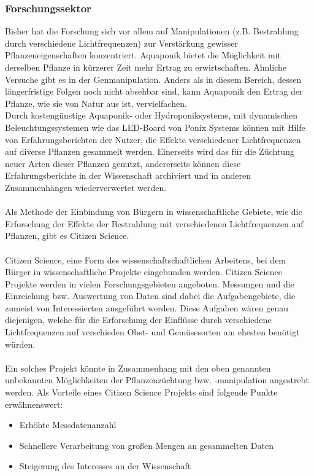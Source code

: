 \subsubsection{Forschungssektor}
Bisher hat die Forschung sich vor allem auf Manipulationen (z.B. Bestrahlung durch verschiedene Lichtfrequenzen) zur Verstärkung gewisser Pflanzeneigenschaften konzentriert. Aquaponik bietet die Möglichkeit mit derselben Pflanze in kürzerer Zeit mehr Ertrag zu erwirtschaften. Ähnliche Versuche gibt es in der Genmanipulation. Anders als in diesem Bereich, dessen längerfristige Folgen noch nicht absehbar sind, kann Aquaponik den Ertrag der Pflanze, wie sie von Natur aus ist, vervielfachen.\\
Durch kostengünstige Aquaponik- oder Hydroponiksysteme, mit dynamischen Beleuchtungssystemen wie das LED-Board von Ponix Systems können mit Hilfe von Erfahrungsberichten der Nutzer, die Effekte verschiedener Lichtfrequenzen auf diverse Pflanzen gesammelt werden. Einerseits wird das für die Züchtung neuer Arten dieser Pflanzen genutzt, andererseits können diese Erfahrungsberichte in der Wissenschaft archiviert und in anderen Zusammenhängen wiederverwertet werden.\\ \mbox{} \\
Als Methode der Einbindung von Bürgern in wissenschaftliche Gebiete, wie die Erforschung der Effekte der Bestrahlung mit verschiedenen Lichtfrequenzen auf Pflanzen, gibt es Citizen Science.\\ \mbox{} \\ Citizen Science, eine Form des wissenschaftschaftlichen Arbeitens, bei dem Bürger in wissenschaftliche Projekte eingebunden werden. Citizen Science Projekte werden in vielen Forschungsgebieten angeboten. Messungen und die Einreichung bzw. Auswertung von Daten sind dabei die Aufgabengebiete, die zumeist von Interessierten ausgeführt werden. Diese Aufgaben wären genau diejenigen, welche für die Erforschung der Einflüsse durch verschiedene Lichtfrequenzen auf verschieden Obst- und Gemüsesorten am ehesten benötigt würden. \\ \mbox{} \\ Ein solches Projekt könnte in Zusammenhang mit den oben genannten unbekannten Möglichkeiten der Pflanzenzüchtung bzw. -manipulation angestrebt werden.  Als Vorteile eines Citizen Science Projekts sind folgende Punkte erwähnenswert:
\begin{itemize}
    \item{Erhöhte Messdatenanzahl}
    \item{Schnellere Verarbeitung von großen Mengen an gesammelten Daten}
    \item{Steigerung des Interesses an der Wissenschaft}
\end{itemize}

